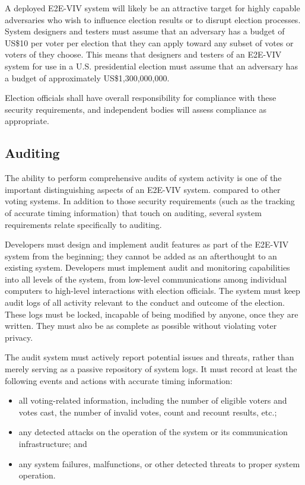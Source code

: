 A deployed E2E-VIV system will likely be an attractive target for
highly capable adversaries who wish to influence election results or
to disrupt election processes. System designers and testers must
assume that an adversary has a budget of US\$10 per voter per election
that they can apply toward any subset of votes or voters of they
choose. This means that designers and testers of an E2E-VIV system for
use in a U.S. presidential election must assume that an adversary has
a budget of approximately US\$1,300,000,000.

Election officials shall have overall responsibility for compliance
with these security requirements, and independent bodies will assess
compliance as appropriate.

\subsection{Auditing}

The ability to perform comprehensive audits of system activity is one
of the important distinguishing aspects of an E2E-VIV system.
compared to other voting systems. In addition to those security
requirements (such as the tracking of accurate timing information)
that touch on auditing, several system requirements relate
specifically to auditing.

Developers must design and implement audit features as part of the
E2E-VIV system from the beginning; they cannot be added as an
afterthought to an existing system. Developers must implement audit
and monitoring capabilities into all levels of the system, from
low-level communications among individual computers to high-level
interactions with election officials. The system must keep audit logs
of all activity relevant to the conduct and outcome of the
election. These logs must be locked, incapable of being modified by
anyone, once they are written. They must also be as complete as
possible without violating voter privacy.

The audit system must actively report potential issues and threats,
rather than merely serving as a passive repository of system logs. It
must record at least the following events and actions with accurate
timing information: 

\begin{itemize}
\item all voting-related information, including the number of eligible
  voters and votes cast, the number of invalid votes, count and
  recount results, etc.;
\item any detected attacks on the operation of the
  system or its communication infrastructure; and
\item any system failures,
  malfunctions, or other detected threats to proper system
  operation. 
\end{itemize}

